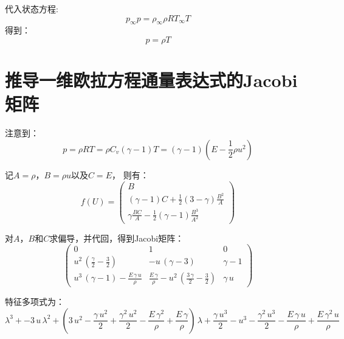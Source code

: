 \documentclass[12pt, a4paper]{article}
\begin{document}
代入状态方程:
    \begin{equation}
        p_{\infty}p = \rho_{\infty}\rho R T_{\infty}T
    \end{equation}
得到：
    \begin{equation}
        p = \rho T
    \end{equation}

\section{推导一维欧拉方程通量表达式的Jacobi矩阵}
注意到：
    \begin{equation}
        p = \rho R T = \rho C_{v}(\gamma - 1)T = (\gamma - 1)(E - \frac{1}{2}\rho u^2)
    \end{equation}

记$A = \rho$，$B = \rho u$以及$C = E$， 则有：
    \begin{equation}
        f(U) = 
        \left(
            \begin{array}{ccc} 
                B\\ 
                (\gamma-1)C + \frac{1}{2}(3-\gamma)\frac{B^2}{A}\\ 
                \gamma\frac{BC}{A}-\frac{1}{2}(\gamma - 1)\frac{B^3}{A^2}
            \end{array}
        \right)
    \end{equation}

    对$A$，$B$和$C$求偏导，并代回，得到Jacobi矩阵：
    \begin{equation}
        \left(
            \begin{array}{ccc} 
                0 & 1 & 0\\ 
                u^2\,\left(\frac{\gamma }{2}-\frac{3}{2}\right) & -u\,\left(\gamma -3\right) & \gamma -1\\ 
                u^3\,\left(\gamma -1\right)-\frac{E\,\gamma \,u}{\rho } & \frac{E\,\gamma }{\rho }-u^2\,\left(\frac{3\,\gamma }{2}-\frac{3}{2}\right) & \gamma \,u 
            \end{array}
        \right)
    \end{equation}
    
    特征多项式为：
    \begin{equation}
        \lambda ^3+-3\,u\,\lambda ^2+\left(3\,u^2-\frac{\gamma \,u^2}{2}+\frac{\gamma ^2\,u^2}{2}-\frac{E\,\gamma ^2}{\rho }+\frac{E\,\gamma }{\rho }\right)\,\lambda +\frac{\gamma \,u^3}{2}-u^3-\frac{\gamma ^2\,u^3}{2}-\frac{E\,\gamma \,u}{\rho }+\frac{E\,\gamma ^2\,u}{\rho }
    \end{equation}
\end{document}
